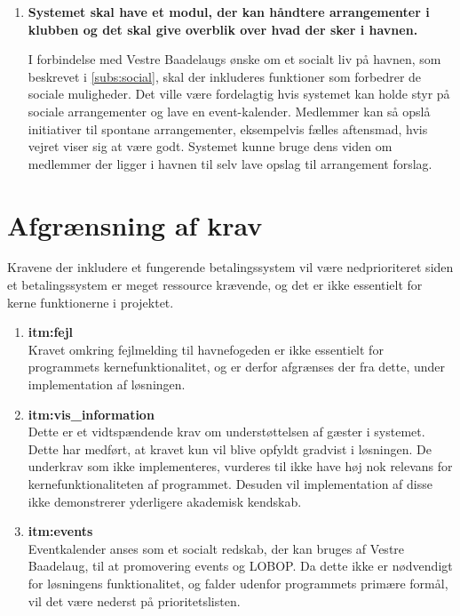 \begin{enumerate}
\item \label{itm:events} \textbf{Systemet skal have et modul, der kan håndtere arrangementer i klubben og det skal give overblik over hvad der sker i havnen.}

I forbindelse med Vestre Baadelaugs ønske om et socialt liv på havnen, som beskrevet i \cref{subs:social}, skal der inkluderes funktioner som forbedrer de sociale muligheder. Det ville være fordelagtig hvis systemet kan holde styr på sociale arrangementer og lave en event-kalender. Medlemmer kan så opslå initiativer til spontane arrangementer, eksempelvis fælles aftensmad, hvis vejret viser sig at være godt. Systemet kunne bruge dens viden om medlemmer der ligger i havnen til selv lave opslag til arrangement forslag.

\end{enumerate}

\section{Afgrænsning af krav}
Kravene der inkludere et fungerende betalingssystem vil være nedprioriteret siden et betalingssystem er meget ressource krævende, og det er ikke essentielt for kerne funktionerne i projektet.

\begin{enumerate}

  \item \label{itm:afg_fejl} \textbf{itm:fejl} \\
  Kravet omkring fejlmelding til havnefogeden er ikke essentielt for programmets kernefunktionalitet, og er derfor afgrænses der fra dette, under implementation af løsningen.

  \item \label{itm:afg_vis_information} \textbf{itm:vis_information} \\
  Dette er et vidtspændende krav om understøttelsen af gæster i systemet. Dette har medført, at kravet kun vil blive opfyldt gradvist i løsningen. De underkrav som ikke implementeres, vurderes til ikke have høj nok relevans for kernefunktionaliteten af programmet. Desuden vil implementation af disse ikke demonstrerer yderligere akademisk kendskab.

  \item \label{itm:afg_events} \textbf{itm:events} \\
  Eventkalender anses som et socialt redskab, der kan bruges af Vestre Baadelaug, til at promovering events og LOBOP. Da dette ikke er nødvendigt for løsningens funktionalitet, og falder udenfor programmets primære formål, vil det være nederst på prioritetslisten.
\end{enumerate}
